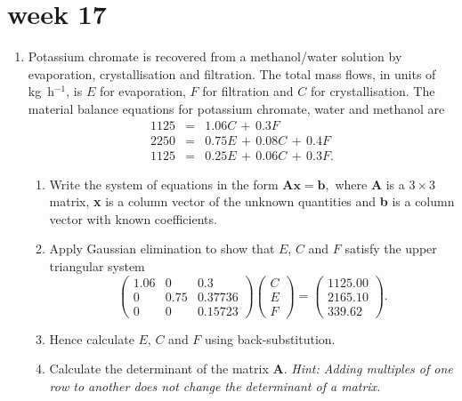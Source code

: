 \documentclass[11pt,a4paper]{article}
\def\bA{\mathbf{A}}
\begin{document}
\vfill\eject
\section*{week 17}

\begin{enumerate}

\item\label{q1206}
Potassium chromate is recovered from a methanol/water solution by evaporation, crystallisation
and filtration. The total mass flows, in units of kg~h$^{-1}$, is $E$ for evaporation, $F$ for filtration and $C$
for crystallisation. The material balance equations for potassium chromate, water and methanol are
\begin{eqnarray*}
1125&=&1.06C\,+\,0.3F\\
2250&=&0.75E\,+\,0.08C\,+\,0.4F\\
1125&=&0.25E\,+\,0.06C\,+\,0.3F .
\end{eqnarray*}
\begin{enumerate}
 \item Write the system of  equations in the form 
       $ \bA \mathbf{x}=\mathbf{b}, $
        where {\bf A} is a $3\times 3$ matrix, {\bf x} is a column vector of the unknown quantities and {\bf b}
is a column vector with known coefficients.
        \item Apply  Gaussian elimination to show that $E$, $C$ and $F$ satisfy the upper triangular system
       $$\left ( \begin{array}{rrrr}
         1.06 & 0 & 0.3  \\
        0 &  0.75& 0.37736 \\
        0  & 0 & 0.15723
         \end{array} \right )
   \left ( \begin{array}{c}
        C \\ E \\ F
            \end{array} \right) =
   \left ( \begin{array}{r}
        1125.00 \\ 2165.10 \\ 339.62  
            \end{array} \right) .$$
          \item  Hence calculate $E$, $C$ and $F$ using  back-substitution.
           \item  Calculate the determinant  of the matrix $\bA$. 
           \emph{Hint: Adding multiples of one row to another does not change the determinant of a matrix.}


\end{enumerate}
\end{enumerate}
\end{document}
